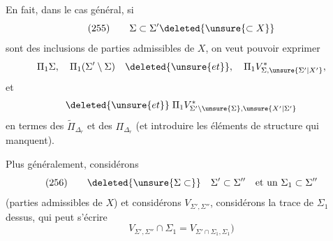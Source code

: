 
En fait, dans le cas général, si
\[
(255)\qquad\Sigma\subset\Sigma'\deleted{\unsure{\subset X}}
\]
sont des inclusions de parties admissibles de $X$, on veut pouvoir exprimer
\[
\Pi_1\Sigma,\quad\Pi_1(\Sigma'\setminus\Sigma)\quad\deleted{\unsure{et}},\quad
\Pi_1V^*_{\Sigma,\unsure{\Sigma'|X'}},
\]
et  
\[
\deleted{\unsure{et}}\;\Pi_1V^*_{\Sigma'\setminus\unsure{\Sigma},\unsure{X'|\Sigma'}}
\]
en termes des $\widetilde\Pi_{\Delta_r}$ et des $\Pi_{\Delta_r}$ (et  introduire les éléments de structure qui manquent).

Plus généralement, considérons
\[
(256)\qquad\deleted{\unsure{\Sigma\subset}}\quad\Sigma'\subset\Sigma''\quad\text{et un }\Sigma_1\subset\Sigma''
\]
 (parties admissibles de $X$) et considérons $V_{\Sigma',\Sigma''}$, considérons la trace de $\Sigma_1$ dessus, qui peut s'écrire
\[
V_{\Sigma',\Sigma''}\cap\Sigma_1=V_{\Sigma'\cap\Sigma_1,\Sigma_1})
\]
